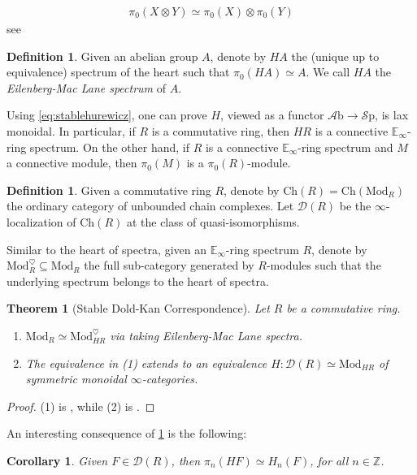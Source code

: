 \documentclass[10pt]{amsart}
\newcommand{\D}{\mathscr{D}}
\newcommand{\bE}{\mathbb{E}}
\newcommand{\bZ}{\mathbb{Z}}
\newcommand{\Sp}{\mathscr{S}\mathrm{p}}
\newcommand{\Ch}{\mathrm{Ch}}
\newcommand{\Mod}{\mathrm{Mod}}
\newcommand{\Ab}{\mathscr{A}\mathrm{b}}
\newtheorem{theorem}[equation]{Theorem}
\newtheorem{corollary}[equation]{Corollary}
\theoremstyle{definition}
\newtheorem{definition}[equation]{Definition}
\theoremstyle{remark}
\numberwithin{equation}{section}
\begin{document}
\begin{align}\label{eq:stablehurewicz}
  \pi_0(X\otimes Y)\simeq\pi_0(X)\otimes\pi_0(Y)
\end{align}
see \cite[Theorem 2.3.28]{davies2024atii}

\begin{definition}Given an abelian group $A$, denote by $HA$ the (unique up to equivalence) spectrum of the heart such that $\pi_0(HA)\simeq A$. We call $HA$ the \emph{Eilenberg-Mac Lane spectrum} of $A$.
\end{definition}
Using \cref{eq:stablehurewicz}, one can prove $H$, viewed as a functor $\Ab\to\Sp$, is lax monoidal. In particular, if $R$ is a commutative ring, then $HR$ is a connective $\bE_\infty$-ring spectrum. On the other hand, if $R$ is a connective $\bE_\infty$-ring spectrum and $M$ a connective module, then $\pi_0(M)$ is a $\pi_0(R)$-module. 
\begin{definition}
  Given a commutative ring $R$, denote by $\Ch(R)=\Ch(\Mod_{R})$ the ordinary category of unbounded chain complexes. Let $\D(R)$ be the $\infty$-localization of $\Ch(R)$ at the class of quasi-isomorphisms.  
\end{definition} 
Similar to the heart of spectra, given an $\bE_\infty$-ring spectrum $R$, denote by $\Mod_{R}^\heartsuit\subseteq \Mod_{R}$ the full sub-category generated by $R$-modules such that the underlying spectrum belongs to the heart of spectra. 
\begin{theorem}[Stable Dold-Kan Correspondence]\label{thm:stabledk}
  Let $R$ be a commutative ring. 
  \begin{enumerate}
    \item $\Mod_{R}\simeq \Mod_{HR}^\heartsuit$ via taking Eilenberg-Mac Lane spectra.
    \item The equivalence in (1) extends to an equivalence $H:\D(R)\simeq \Mod_{HR}$ of symmetric monoidal $\infty$-categories.
  \end{enumerate} 
\end{theorem}
\begin{proof}
  (1) is \cite[Proposition 7.1.1.13]{lurie2017ha}, while (2) is \cite[Theorem 7.1.2.13]{lurie2017ha}.
\end{proof}
An interesting consequence of \cref{thm:stabledk} is the following:
\begin{corollary}\label{cor:homotopyvshomology}
  Given $F\in\D(R)$, then $\pi_n(HF)\simeq H_n(F)$, for all $n\in\bZ$.
\end{corollary}
\end{document}
